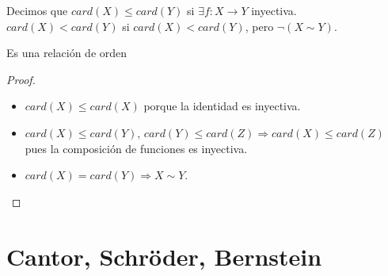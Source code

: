 \begin{definition}
	Decimos que \(card(X) \leq card(Y)\) si \(\exists f: X \to Y\) inyectiva. \\
	\(card(X) < card(Y)\) si \(card(X) < card(Y)\), pero \(\neg(X\sim Y)\).
\end{definition}

\begin{prop}
	Es una relación de orden
	\begin{proof}
		\begin{itemize}
			\item \(card(X) \leq card(X)\) porque la identidad es inyectiva.
			\item \(card(X) \leq card(Y)\), \(card(Y) \leq card(Z) \Rightarrow card(X) \leq card(Z)\) pues la composición de funciones es inyectiva.
			\item \(card(X) = card(Y) \Rightarrow X \sim Y\).
		\end{itemize}
	\end{proof}
\end{prop}

\section{Cantor, Schröder, Bernstein}

